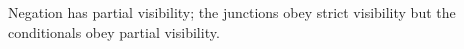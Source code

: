 





\usepackage[utf8]{inputenc}































Negation has partial visibility; the junctions obey strict visibility but the conditionals obey partial visibility.

